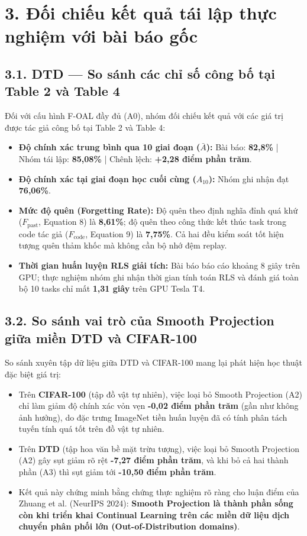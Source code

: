 \documentclass{article}
\begin{document}
\section{3. Đối chiếu kết quả tái lập thực nghiệm với bài báo gốc}

\subsection{3.1. DTD — So sánh các chỉ số công bố tại Table 2 và Table 4}
Đối với cấu hình F-OAL đầy đủ (A0), nhóm đối chiếu kết quả với các giá trị được tác giả công bố tại Table 2 và Table 4:
\begin{itemize}
    \item \textbf{Độ chính xác trung bình qua 10 giai đoạn ($\bar{A}$):} Bài báo: \textbf{82,8\%} | Nhóm tái lập: \textbf{85,08\%} | Chênh lệch: \textbf{+2,28 điểm phần trăm}.
    \item \textbf{Độ chính xác tại giai đoạn học cuối cùng ($A_{10}$):} Nhóm ghi nhận đạt \textbf{76,06\%}.
    \item \textbf{Mức độ quên (Forgetting Rate):} Độ quên theo định nghĩa đỉnh quá khứ ($F_{\text{past}}$, Equation 8) là \textbf{8,61\%}; độ quên theo công thức kết thúc task trong code tác giả ($F_{\text{code}}$, Equation 9) là \textbf{7,75\%}. Cả hai đều kiểm soát tốt hiện tượng quên thảm khốc mà không cần bộ nhớ đệm replay.
    \item \textbf{Thời gian huấn luyện RLS giải tích:} Bài báo báo cáo khoảng 8 giây trên GPU; thực nghiệm nhóm ghi nhận thời gian tính toán RLS và đánh giá toàn bộ 10 tasks chỉ mất \textbf{1,31 giây} trên GPU Tesla T4.
\end{itemize}

\subsection{3.2. So sánh vai trò của Smooth Projection giữa miền DTD và CIFAR-100}
So sánh xuyên tập dữ liệu giữa DTD và CIFAR-100 mang lại phát hiện học thuật đặc biệt giá trị:
\begin{itemize}
    \item Trên \textbf{CIFAR-100} (tập đồ vật tự nhiên), việc loại bỏ Smooth Projection (A2) chỉ làm giảm độ chính xác vỏn vẹn \textbf{-0,02 điểm phần trăm} (gần như không ảnh hưởng), do đặc trưng ImageNet tiền huấn luyện đã có tính phân tách tuyến tính quá tốt trên đồ vật tự nhiên.
    \item Trên \textbf{DTD} (tập hoa văn bề mặt trừu tượng), việc loại bỏ Smooth Projection (A2) gây sụt giảm rõ rệt \textbf{-7,27 điểm phần trăm}, và khi bỏ cả hai thành phần (A3) thì sụt giảm tới \textbf{-10,50 điểm phần trăm}.
    \item Kết quả này chứng minh bằng chứng thực nghiệm rõ ràng cho luận điểm của Zhuang et al. (NeurIPS 2024): \textbf{Smooth Projection là thành phần sống còn khi triển khai Continual Learning trên các miền dữ liệu dịch chuyển phân phối lớn (Out-of-Distribution domains)}.
\end{itemize}
\end{document}
